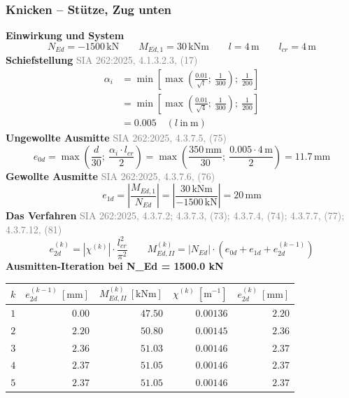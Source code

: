 \documentclass[11pt,a4paper]{article}
\newcommand{\normref}[1]{{\small\textcolor{gray}{#1}}}
\begin{document}
\subsubsection{Knicken – Stütze, Zug unten}
\noindent\textbf{Einwirkung und System}
\begin{equation*}
N_{Ed} = -1500\,\mathrm{kN} \qquad M_{Ed,1} = 30\,\mathrm{kNm} \qquad l = 4\,\mathrm{m} \qquad l_{cr} = 4\,\mathrm{m}
\end{equation*}
\noindent\textbf{Schiefstellung} \hfill \normref{SIA 262:2025, 4.1.3.2.3, (17)}
\begin{equation*}
\begin{aligned}
  \alpha_i &= \min\left[\max\left(\frac{0.01}{\sqrt{l}};\ \frac{1}{300}\right);\ \frac{1}{200}\right] \\
  &= \min\left[\max\left(\frac{0.01}{\sqrt{4}};\ \frac{1}{300}\right);\ \frac{1}{200}\right] \\
  &= 0.005 \quad \left(l\ \text{in}\ \mathrm{m}\right)
\end{aligned}
\end{equation*}
\noindent\textbf{Ungewollte Ausmitte} \hfill \normref{SIA 262:2025, 4.3.7.5, (75)}
\begin{equation*}
e_{0d} = \max\left(\frac{d}{30};\ \frac{\alpha_i \cdot l_{cr}}{2}\right) = \max\left(\frac{350\,\mathrm{mm}}{30};\ \frac{0.005 \cdot 4\,\mathrm{m}}{2}\right) = 11.7\,\mathrm{mm}
\end{equation*}
\noindent\textbf{Gewollte Ausmitte} \hfill \normref{SIA 262:2025, 4.3.7.6, (76)}
\begin{equation*}
e_{1d} = \left|\frac{M_{Ed,1}}{N_{Ed}}\right| = \left|\frac{30\,\mathrm{kNm}}{-1500\,\mathrm{kN}}\right| = 20\,\mathrm{mm}
\end{equation*}
\noindent\textbf{Das Verfahren} \hfill \normref{SIA 262:2025, 4.3.7.2; 4.3.7.3, (73); 4.3.7.4, (74); 4.3.7.7, (77); 4.3.7.12, (81)}
\begin{equation*}
e_{2d}^{(k)} = \left|\chi^{(k)}\right| \cdot \frac{l_{cr}^{2}}{\pi^{2}} \qquad M_{Ed,II}^{(k)} = \left|N_{Ed}\right| \cdot \left(e_{0d} + e_{1d} + e_{2d}^{(k-1)}\right)
\end{equation*}
\noindent\textbf{Ausmitten-Iteration bei N\_Ed = 1500.0 kN}
\begin{longtable}{rrrrr}
\hline
$k$ & $e_{2d}^{(k-1)}\ [\mathrm{mm}]$ & $M_{Ed,II}^{(k)}\ [\mathrm{kNm}]$ & $\chi^{(k)}\ [\mathrm{m}^{-1}]$ & $e_{2d}^{(k)}\ [\mathrm{mm}]$ \\
\hline
\endhead
$1$ & $0.00$ & $47.50$ & $0.00136$ & $2.20$ \\
$2$ & $2.20$ & $50.80$ & $0.00145$ & $2.36$ \\
$3$ & $2.36$ & $51.03$ & $0.00146$ & $2.37$ \\
$4$ & $2.37$ & $51.05$ & $0.00146$ & $2.37$ \\
$5$ & $2.37$ & $51.05$ & $0.00146$ & $2.37$ \\
\hline
\end{longtable}
\end{document}
